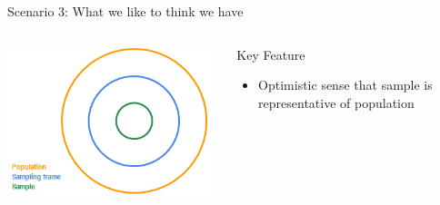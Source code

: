 \documentclass[aspectratio=169]{../latex_main/tntbeamer}  %
\begin{document}
	
	\begin{frame}{Scenario 3: What we like to think we have}
	    \begin{columns}
	        \begin{column}{.4\textwidth}

	               \includegraphics[scale=.75]{Bild5}

	        \end{column}
	        
	        \begin{column}{.4\textwidth}
	            Key Feature
                \begin{itemize}
                    \item Optimistic sense that sample is representative of population
                \end{itemize}
	        \end{column}
	        
	    \end{columns}
	    
	\end{frame}
	
\end{document}

